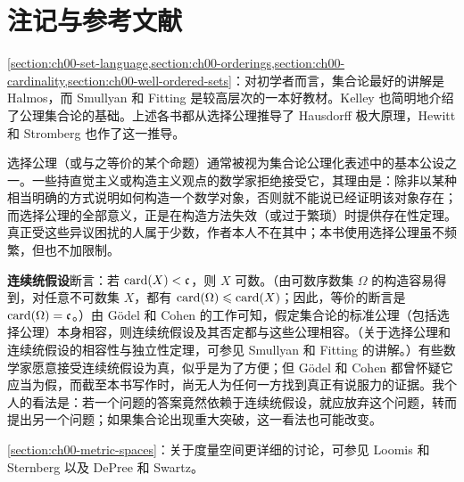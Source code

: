 \documentclass[../../main.tex]{subfiles}%
\begin{document}
\section{注记与参考文献}\label{section:ch00-notes-references}

\cref{section:ch00-set-language,section:ch00-orderings,section:ch00-cardinality,section:ch00-well-ordered-sets}：对初学者而言，集合论最好的讲解是 Halmos\cite{folland-bib-062}，而 Smullyan 和 Fitting\cite{folland-bib-135} 是较高层次的一本好教材。Kelley\cite{folland-bib-083}
也简明地介绍了公理集合论的基础。上述各书都从选择公理推导了 Hausdorff 极大原理，Hewitt 和 Stromberg\cite{folland-bib-076} 也作了这一推导。

选择公理（或与之等价的某个命题）通常被视为集合论公理化表述中的基本公设之一。一些持直觉主义或构造主义观点的数学家拒绝接受它，其理由是：除非以某种相当明确的方式说明如何构造一个数学对象，否则就不能说已经证明该对象存在；而选择公理的全部意义，正是在构造方法失效（或过于繁琐）时提供存在性定理。真正受这些异议困扰的人属于少数，作者本人不在其中；本书使用选择公理虽不频繁，但也不加限制。

\textbf{连续统假设}断言：若 $\operatorname{card}(X)<\mathfrak{c}$，则 $X$ 可数。（由可数序数集 $\Omega$ 的构造容易得到，对任意不可数集 $X$，都有 $\operatorname{card}(\Omega)\leqslant\operatorname{card}(X)$；因此，等价的断言是 $\operatorname{card}(\Omega)=\mathfrak{c}$。）由 Gödel 和 Cohen 的工作可知，假定集合论的标准公理（包括选择公理）本身相容，则连续统假设及其否定都与这些公理相容。（关于选择公理和连续统假设的相容性与独立性定理，可参见 Smullyan 和 Fitting\cite{folland-bib-135} 的讲解。）有些数学家愿意接受连续统假设为真，似乎是为了方便；但 Gödel\cite{folland-bib-056} 和 Cohen\cite[151]{folland-bib-026} 都曾怀疑它应当为假，而截至本书写作时，尚无人为任何一方找到真正有说服力的证据。我个人的看法是：若一个问题的答案竟然依赖于连续统假设，就应放弃这个问题，转而提出另一个问题；如果集合论出现重大突破，这一看法也可能改变。

\cref{section:ch00-metric-spaces}：关于度量空间更详细的讨论，可参见 Loomis 和 Sternberg\cite{folland-bib-095} 以及 DePree 和 Swartz\cite{folland-bib-032}。
\end{document}

